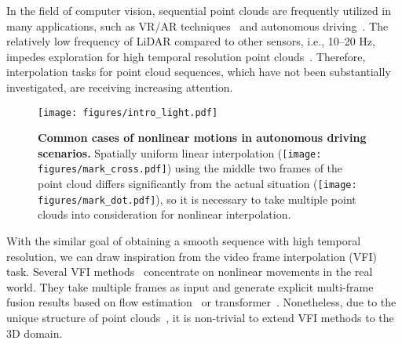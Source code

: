 \documentclass[10pt,twocolumn,letterpaper]{article}
\begin{document}
In the field of computer vision, sequential point clouds are frequently utilized in many applications, such as VR/AR techniques~\cite{wang2021self, garrido2021point, zhang2021sequential} and autonomous driving~\cite{qi2021offboard, chen2021moving, yang2021auto4d}. The relatively low frequency of LiDAR compared to other sensors, i.e., 10–20 Hz, impedes exploration for high temporal resolution point clouds~\cite{zeng2022idea}. Therefore, interpolation tasks for point cloud sequences, which have not been substantially investigated, are receiving increasing attention.


\begin{figure}[t]
\centering
  \texttt{[image: figures/intro\_light.pdf]}
\vspace{-0.2cm}
  \caption{\textbf{Common cases of nonlinear motions in autonomous driving scenarios.} Spatially uniform linear interpolation (\texttt{[image: figures/mark\_cross.pdf]}) using the middle two frames of the point cloud differs significantly from the actual situation (\texttt{[image: figures/mark\_dot.pdf]}), so it is necessary to take multiple point clouds into consideration for nonlinear interpolation.}
  \label{fig:nonlinear scenes}
\vspace{-0.4cm}
\end{figure}  

With the similar goal of obtaining a smooth sequence with high temporal resolution, we can draw inspiration from the video frame interpolation (VFI) task. Several VFI methods~\cite{zhang2019multi, xu2019quadratic, liu2020enhanced, dutta2022non, shi2022video, chi2020all} concentrate on nonlinear movements in the real world. They take multiple frames as input and generate explicit multi-frame fusion results based on flow estimation~\cite{xu2019quadratic, zhang2019multi, liu2020enhanced, dutta2022non, chi2020all} or transformer~\cite{shi2022video}. Nonetheless, due to the unique structure of point clouds~\cite{qi2017pointnet}, it is non-trivial to extend VFI methods to the 3D domain.
\end{document}
